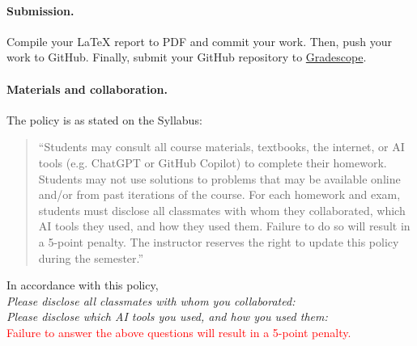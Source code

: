 \documentclass[11pt,letterpaper,english,oneside]{article} %
\theoremstyle{definition} %
\begin{document}
\paragraph{Submission.} Compile your LaTeX report to PDF and commit your work. Then, push your work to GitHub. Finally, submit your GitHub repository to \href{https://www.gradescope.com/courses/589902}{Gradescope}.

\paragraph{Materials and collaboration.} The policy is as stated on the Syllabus:

\begin{quote}
``Students may consult all course materials, textbooks, the internet, or AI tools (e.g. ChatGPT or GitHub Copilot) to complete their homework. Students may not use solutions to problems that may be available online and/or from past iterations of the course. For each homework and exam, students must disclose all classmates with whom they collaborated, which AI tools they used, and how they used them. Failure to do so will result in a 5-point penalty. The instructor reserves the right to update this policy during the semester.''
\end{quote}

\noindent In accordance with this policy, \\

\noindent \textit{Please disclose all classmates with whom you collaborated:} \\

\noindent \textit{Please disclose which AI tools you used, and how you used them:} \\

\noindent \textcolor{red}{Failure to answer the above questions will result in a 5-point penalty.}

\clearpage
\end{document}
